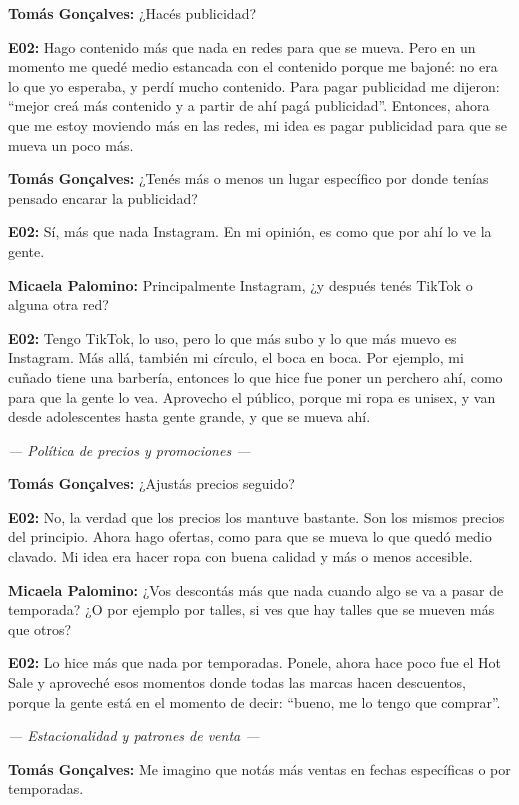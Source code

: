 \noindent\textbf{Tomás Gonçalves:} ¿Hacés publicidad?

\noindent\textbf{E02:} Hago contenido más que nada en redes para que se mueva. Pero en un momento me quedé medio estancada con el contenido porque me bajoné: no era lo que yo esperaba, y perdí mucho contenido. Para pagar publicidad me dijeron: ``mejor creá más contenido y a partir de ahí pagá publicidad''. Entonces, ahora que me estoy moviendo más en las redes, mi idea es pagar publicidad para que se mueva un poco más.

\noindent\textbf{Tomás Gonçalves:} ¿Tenés más o menos un lugar específico por donde tenías pensado encarar la publicidad?

\noindent\textbf{E02:} Sí, más que nada Instagram. En mi opinión, es como que por ahí lo ve la gente.

\noindent\textbf{Micaela Palomino:} Principalmente Instagram, ¿y después tenés TikTok o alguna otra red?

\noindent\textbf{E02:} Tengo TikTok, lo uso, pero lo que más subo y lo que más muevo es Instagram. Más allá, también mi círculo, el boca en boca. Por ejemplo, mi cuñado tiene una barbería, entonces lo que hice fue poner un perchero ahí, como para que la gente lo vea. Aprovecho el público, porque mi ropa es unisex, y van desde adolescentes hasta gente grande, y que se mueva ahí.

\noindent\textit{--- Política de precios y promociones ---}

\noindent\textbf{Tomás Gonçalves:} ¿Ajustás precios seguido?

\noindent\textbf{E02:} No, la verdad que los precios los mantuve bastante. Son los mismos precios del principio. Ahora hago ofertas, como para que se mueva lo que quedó medio clavado. Mi idea era hacer ropa con buena calidad y más o menos accesible.

\noindent\textbf{Micaela Palomino:} ¿Vos descontás más que nada cuando algo se va a pasar de temporada? ¿O por ejemplo por talles, si ves que hay talles que se mueven más que otros?

\noindent\textbf{E02:} Lo hice más que nada por temporadas. Ponele, ahora hace poco fue el Hot Sale y aproveché esos momentos donde todas las marcas hacen descuentos, porque la gente está en el momento de decir: ``bueno, me lo tengo que comprar''.

\noindent\textit{--- Estacionalidad y patrones de venta ---}

\noindent\textbf{Tomás Gonçalves:} Me imagino que notás más ventas en fechas específicas o por temporadas.

